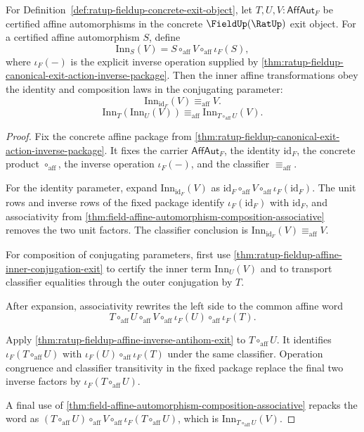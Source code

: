 \begin{theorem}
\label{thm:ratup-fieldup-affine-inner-action-composition-exit}
For Definition~\ref{def:ratup-fieldup-concrete-exit-object}, let
$T,U,V:\mathsf{AffAut}_F$ be certified affine automorphisms in the concrete
$\FieldUp(\RatUp)$ exit object. For a certified affine automorphism $S$, define
$$
\mathrm{Inn}_S(V)=S\circ_{\mathrm{aff}}V\circ_{\mathrm{aff}}\iota_F(S),
$$
where $\iota_F(-)$ is the explicit inverse operation supplied by
\autoref{thm:ratup-fieldup-canonical-exit-action-inverse-package}. Then the
inner affine transformations obey the identity and composition laws in the
conjugating parameter:
$$
\mathrm{Inn}_{\mathrm{id}_F}(V)\equiv_{\mathrm{aff}}V.
$$
$$
\mathrm{Inn}_T(\mathrm{Inn}_U(V))\equiv_{\mathrm{aff}}
\mathrm{Inn}_{T\circ_{\mathrm{aff}}U}(V).
$$
\end{theorem}
\begin{proof}
Fix the concrete affine package from
\autoref{thm:ratup-fieldup-canonical-exit-action-inverse-package}. It fixes the
carrier $\mathsf{AffAut}_F$, the identity $\mathrm{id}_F$, the concrete product
$\circ_{\mathrm{aff}}$, the inverse operation $\iota_F(-)$, and the classifier
$\equiv_{\mathrm{aff}}$.

For the identity parameter, expand
$\mathrm{Inn}_{\mathrm{id}_F}(V)$ as
$\mathrm{id}_F\circ_{\mathrm{aff}}V\circ_{\mathrm{aff}}\iota_F(\mathrm{id}_F)$.
The unit rows and inverse rows of the fixed package identify
$\iota_F(\mathrm{id}_F)$ with $\mathrm{id}_F$, and associativity from
\autoref{thm:field-affine-automorphism-composition-associative} removes the two
unit factors. The classifier conclusion is
$\mathrm{Inn}_{\mathrm{id}_F}(V)\equiv_{\mathrm{aff}}V$.

For composition of conjugating parameters, first use
\autoref{thm:ratup-fieldup-affine-inner-conjugation-exit} to certify the inner
term $\mathrm{Inn}_U(V)$ and to transport classifier equalities through the
outer conjugation by $T$.

After expansion, associativity rewrites the left side to the common affine
word
$$
T\circ_{\mathrm{aff}}U\circ_{\mathrm{aff}}V\circ_{\mathrm{aff}}
\iota_F(U)\circ_{\mathrm{aff}}\iota_F(T).
$$

Apply
\autoref{thm:ratup-fieldup-affine-inverse-antihom-exit} to
$T\circ_{\mathrm{aff}}U$. It identifies
$\iota_F(T\circ_{\mathrm{aff}}U)$ with
$\iota_F(U)\circ_{\mathrm{aff}}\iota_F(T)$ under the same classifier. Operation
congruence and classifier transitivity in the fixed package replace the final
two inverse factors by $\iota_F(T\circ_{\mathrm{aff}}U)$.

A final use of
\autoref{thm:field-affine-automorphism-composition-associative} repacks the
word as
$(T\circ_{\mathrm{aff}}U)\circ_{\mathrm{aff}}V\circ_{\mathrm{aff}}
\iota_F(T\circ_{\mathrm{aff}}U)$, which is
$\mathrm{Inn}_{T\circ_{\mathrm{aff}}U}(V)$.
\end{proof}

